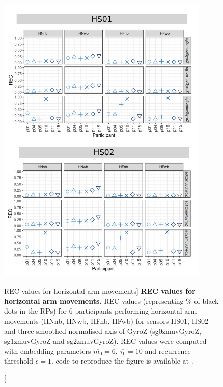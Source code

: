 \begin{figure}
\centering
\includegraphics[width=0.9\textwidth]{rqa_rec_H_w500}
    \caption
	[REC values for horizontal arm movements]{
	{\bf REC values for horizontal arm movements.}	
	REC values (representing \% of black dots in the RPs) for 
	6 participants performing horizontal arm movements 
	(HNnb, HNwb, HFnb, HFwb)
	for sensors HS01, HS02 and three smoothed-normalised axis 
	of GyroZ (sg0zmuvGyroZ, sg1zmuvGyroZ and sg2zmuvGyroZ).
	REC values were computed with 
	embedding parameters $\overline{m_0}=6$, $\overline{\tau_0}=10$ and
	recurrence threshold $\epsilon=1$.
		\R code to reproduce the figure is available at 
		.
        }
    \label{fig:rqa_rec_H}
\end{figure}
